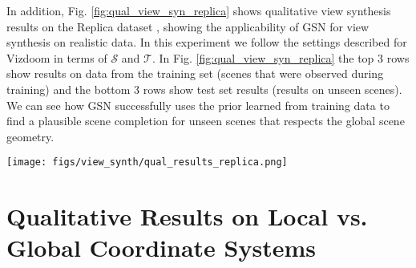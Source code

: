 \documentclass[10pt,twocolumn,letterpaper]{article}
\begin{document}
In addition, Fig. \ref{fig:qual_view_syn_replica} shows qualitative view synthesis results on the Replica dataset \cite{replica}, showing the applicability of GSN for view synthesis on realistic data. In this experiment we follow the settings described for Vizdoom in terms of $\mathcal{S}$ and $\mathcal{T}$. In Fig. \ref{fig:qual_view_syn_replica} the top 3 rows show results on data from the training set (\eg scenes that were observed during training) and the bottom 3 rows show test set results (\eg results on unseen scenes). We can see how GSN successfully uses the prior learned from training data to find a plausible scene completion for unseen scenes that respects the global scene geometry.

\begin{figure*}[h]
	\centering
	\texttt{[image: figs/view\_synth/qual\_results\_replica.png]}
	\caption{Qualitative view synthesis results on Replica. Given source views $\mathcal{S}$ we invert GSN to obtain a local latent code grid $\hat{\textbf{W}}$, which is then use both to reconstruct $\mathcal{S}$, denoted as $\hat{\mathcal{S}}$, and also to predict target views $\mathcal{T}$ (given their camera poses) which are denoted as $\hat{\mathcal{T}}$. Each row corresponds to a different set of source views $\mathcal{S}$ (top 3 rows are scenes from the training set, bottom 3 rows are scenes in a heldout test set). Frames highlighted in green are input to GSN, frames highlighted in blue are predictions.}
	\label{fig:qual_view_syn_replica}
\end{figure*}

\section{Qualitative Results on Local vs. Global Coordinate Systems} 
\end{document}
